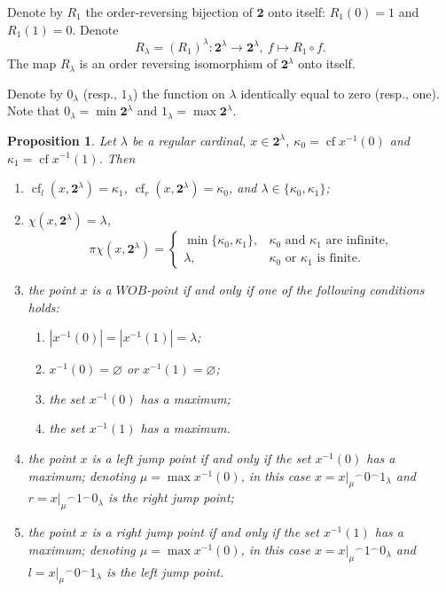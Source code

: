 \documentclass[preprint]{elsarticle}
\def\la{\lambda}
\def\ka{\kappa}
\def\es{\varnothing}
\def\sset#1{\{#1\}}
\newcommand\restrB[2]{\ensuremath{\left.#1\right|_{#2}}}
\def\restr#1#2{\restrB{#1}{#2}}
\newtheorem{proposition}{Proposition}[section]
\theoremstyle{definition}
\theoremstyle{remark}
\def\cf{\operatorname{cf}}
\def\lex#1#2{\mathfrak{L}(#2^{#1})}
\def\lex#1#2{#2^{#1}}
\def\symblecnc{\mathbin{{}^\frown}}
\def\wob/{$WOB$}
\def\B{2}
\def\B{\mathsf{2}}
\def\B{\mathbf{2}}
\def\lexab{\lex\la\B}
\begin{document}
Denote by $R_1$ the order-reversing bijection of $\B$ onto itself: $R_1(0)=1$ and $R_1(1)=0$.
Denote
\[
R_\la=(R_1)^\la: \lexab\to \lexab,\ f\mapsto R_1\circ f.
\]
The map $R_\la$ is
an order reversing isomorphism of $\lexab$ onto itself.

Denote by $0_\la$ (resp., $1_\la$) the function on $\la$ identically equal to zero (resp., one). Note that $0_\la =\min \lexab$ and $1_\la =\max \lexab$.



\begin{proposition}\label{p:blex:1}
Let $\la$ be a regular cardinal, $x\in \lexab$, $\ka_0=\cf x^{-1}(0)$ and $\ka_1=\cf x^{-1}(1)$. Then 
\begin{enumerate}
\item
$\cf_l(x,\lexab)=\ka_1$, $\cf_r(x,\lexab)=\ka_0$, and $\la\in\sset{\ka_0,\ka_1}$;
\item
$\chi(x,\lexab)=\la$, 
\[
\pi\chi(x,\lexab)=\begin{cases}
\min \sset{\ka_0, \ka_1}, & \ka_0\text{ and }\ka_1\text{  are infinite,}
\\
\la, & \ka_0\text{ or }\ka_1\text{ is finite.}
\end{cases}
\]
\item
the point $x$ is a \wob/-point if and only if one of the following conditions holds:
\begin{enumerate}
\item
$|x^{-1}(0)|=|x^{-1}(1)|=\la$;
\item
$x^{-1}(0) =\es$  or $x^{-1}(1) =\es$;
\item
the set $x^{-1}(0)$ has a maximum;
\item
the set $x^{-1}(1)$ has a maximum.
\end{enumerate}
\item
the point $x$ is a left jump point if and only if the set $x^{-1}(0)$ has a maximum; denoting $\mu = \max x^{-1}(0)$, in this case $x=\restr x\mu \symblecnc 0 \symblecnc 1_\la$ and $r=\restr x\mu \symblecnc 1 \symblecnc 0_\la$ is the right jump point;
\item
the point $x$ is a right jump point if and only if the set $x^{-1}(1)$ has a maximum; denoting $\mu = \max x^{-1}(0)$, in this case $x=\restr x\mu \symblecnc 1 \symblecnc 0_\la$ and $l=\restr x\mu \symblecnc 0 \symblecnc 1_\la$ is the left jump point.
\end{enumerate}
\end{proposition}
\end{document}
